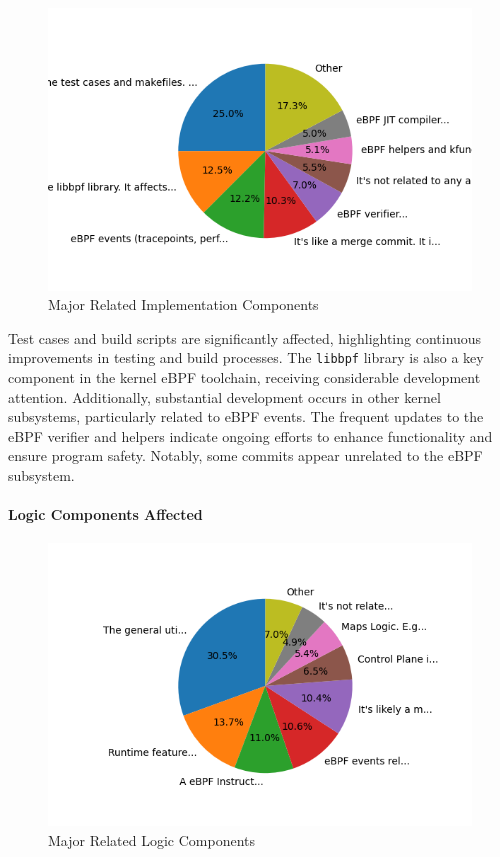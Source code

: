 \begin{figure}[ht]
    \centering
    \includegraphics[width=\linewidth]{feature-analysis/commit_pie_chart_major_implementation_component.png}
    \caption{Major Related Implementation Components}
    \label{fig:commit_pie_chart_major_implementation_component}
\end{figure}

Test cases and build scripts are significantly affected, highlighting continuous improvements in testing and build processes. The \texttt{libbpf} library is also a key component in the kernel eBPF toolchain, receiving considerable development attention. Additionally, substantial development occurs in other kernel subsystems, particularly related to eBPF events. The frequent updates to the eBPF verifier and helpers indicate ongoing efforts to enhance functionality and ensure program safety. Notably, some commits appear unrelated to the eBPF subsystem.

\paragraph{Logic Components Affected}

\begin{figure}[ht]
    \centering
    \includegraphics[width=\linewidth]{feature-analysis/commit_pie_chart_major_logic_component.png}
    \caption{Major Related Logic Components}
    \label{fig:commit_pie_chart_major_logic_component}
\end{figure}

